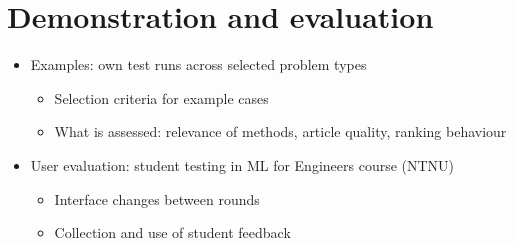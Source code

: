 \section{Demonstration and evaluation}

\begin{itemize}
    \item Examples: own test runs across selected problem types
    \begin{itemize}
        \item Selection criteria for example cases
        \item What is assessed: relevance of methods, article quality, ranking behaviour
    \end{itemize}
    \item User evaluation: student testing in ML for Engineers course (NTNU)
    \begin{itemize}
        \item Interface changes between rounds
        \item Collection and use of student feedback
    \end{itemize}
\end{itemize}